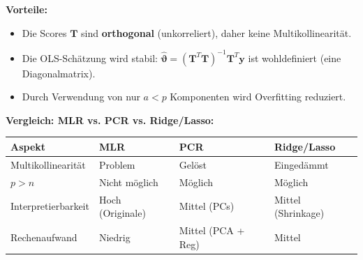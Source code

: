 \textbf{Vorteile:}
\begin{itemize}[leftmargin=1.5em]
    \item Die Scores $\mathbf{T}$ sind \textbf{orthogonal} (unkorreliert), daher keine Multikollinearität.
    \item Die OLS-Schätzung wird stabil: $\hat{\boldsymbol{\vartheta}} = (\mathbf{T}^T \mathbf{T})^{-1} \mathbf{T}^T \mathbf{y}$ ist wohldefiniert (eine Diagonalmatrix).
    \item Durch Verwendung von nur $a < p$ Komponenten wird Overfitting reduziert.
\end{itemize}


\textbf{Vergleich: MLR vs. PCR vs. Ridge/Lasso:}
\begin{table}[h]
    \centering
    \small
    \begin{tabular}{|l|l|l|l|}
        \hline
        \textbf{Aspekt} & \textbf{MLR} & \textbf{PCR} & \textbf{Ridge/Lasso} \\
        \hline
        Multikollinearität & Problem & Gelöst & Eingedämmt \\
        \hline
        $p > n$ & Nicht möglich & Möglich & Möglich \\
        \hline
        Interpretierbarkeit & Hoch (Originale) & Mittel (PCs) & Mittel (Shrinkage) \\
        \hline
        Rechenaufwand & Niedrig & Mittel (PCA + Reg) & Mittel \\
        \hline
    \end{tabular}
\end{table}

